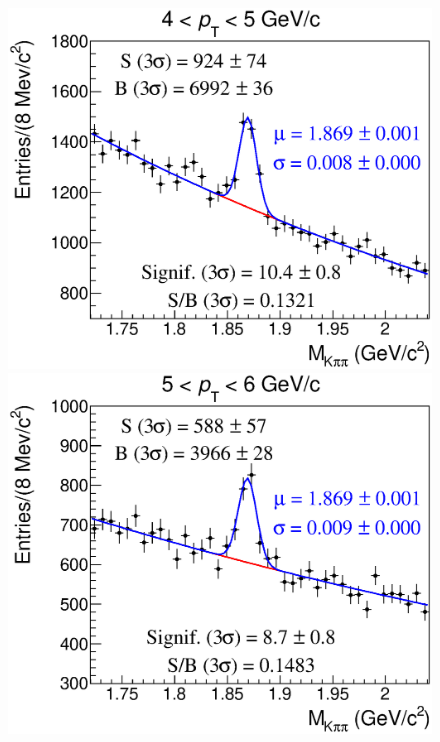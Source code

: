 \documentclass[b5paper,10pt,twoside,oldstyle,classica]{toptesi}
\begin{document}
\begin{figure}[h]
\begin{center}
\vspace{0cm}
{\includegraphics[scale = 0.25]{MassFitSet1_Pt2.eps}}
\hspace{0cm}
{\includegraphics[scale = 0.25]{MassFitSet1_Pt3.eps}}
\vspace{0cm}

\end{center}
\end{figure}
\end{document}
